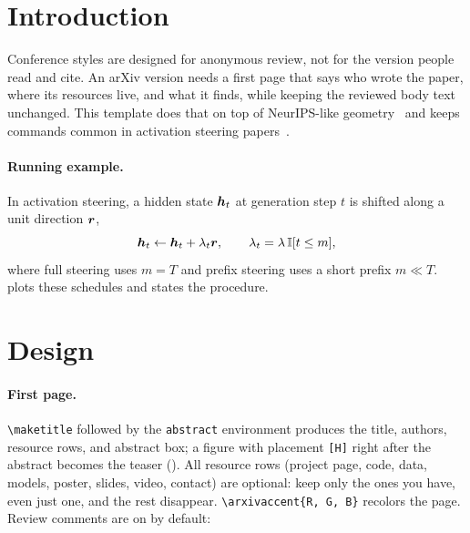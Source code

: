 \documentclass[11pt]{article}
\begin{document}
\arxivoutline

\section{Introduction}

Conference styles are designed for anonymous review, not for the version people read and cite. An arXiv version needs a first page that says who wrote the paper, where its resources live, and what it finds, while keeping the reviewed body text unchanged. This template does that on top of NeurIPS-like geometry~\citep{NEURIPS2020_1457c0d6} and keeps commands common in activation steering papers~\citep{turner2023steering, rimsky-etal-2024-steering, zou2023transparency}.


\paragraph{Running example.} In activation steering, a hidden state $\boldsymbol{h}_t$ at generation step $t$ is shifted along a unit direction $\boldsymbol{r}$,
\begin{equation}\label{eq:steer}
\boldsymbol{h}_t \leftarrow \boldsymbol{h}_t + \lambda_t \boldsymbol{r}, \qquad \lambda_t = \lambda\,\mathbb{I}[t \le m],
\end{equation}
where full steering uses $m = T$ and prefix steering uses a short prefix $m \ll T$.  plots these schedules and  states the procedure.

\section{Design}

\paragraph{First page.} \texttt{\textbackslash maketitle} followed by the \texttt{abstract} environment produces the title, authors, resource rows, and abstract box; a figure with placement \texttt{[H]} right after the abstract becomes the teaser (). All resource rows (project page, code, data, models, poster, slides, video, contact) are optional: keep only the ones you have, even just one, and the rest disappear. \texttt{\textbackslash arxivaccent\{R, G, B\}} recolors the page. Review comments are on by default:    
\end{document}
